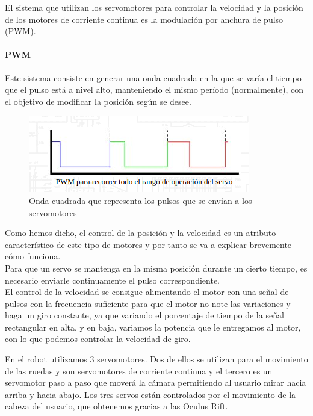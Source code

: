 \documentclass[twoside, 11pt]{epstfg}
\begin{document}
El sistema que utilizan los servomotores para controlar la velocidad y la posición de los motores de corriente continua es la modulación por anchura de pulso (PWM).

\paragraph{PWM}

Este sistema consiste en generar una onda cuadrada en la que se varía el tiempo que el pulso está a nivel alto, manteniendo el mismo período (normalmente), con el objetivo de modificar la posición según se desee.

\begin{figure}[h]
	\centerline{
		\mbox{\includegraphics[width=.80\textwidth]{images/ondaServo.png}}
	}
	\caption{Onda cuadrada que representa los pulsos que se envían a los servomotores}
	\label{ondaservo}
\end{figure}


Como hemos dicho, el control de la posición y la velocidad es un atributo característico de este tipo de motores y por tanto se va a explicar brevemente cómo funciona.\\
Para que un servo se mantenga en la misma posición durante un cierto tiempo, es necesario enviarle continuamente el pulso correspondiente.\\
El control de la velocidad se consigue alimentando el motor con una señal de pulsos con la frecuencia suficiente para que el motor no note las variaciones y haga un giro constante, ya que variando el porcentaje de tiempo de la señal rectangular en alta, y en baja, variamos la potencia que le entregamos al motor, con lo que podemos controlar la velocidad de giro.

En el robot utilizamos 3 servomotores.
Dos de ellos se utilizan para el movimiento de las ruedas y son servomotores de corriente continua y el tercero es un servomotor paso a paso que moverá la cámara permitiendo al usuario mirar hacia arriba y hacia abajo.
Los tres servos están controlados por el movimiento de la cabeza del usuario, que obtenemos gracias a las Oculus Rift.
\end{document}

